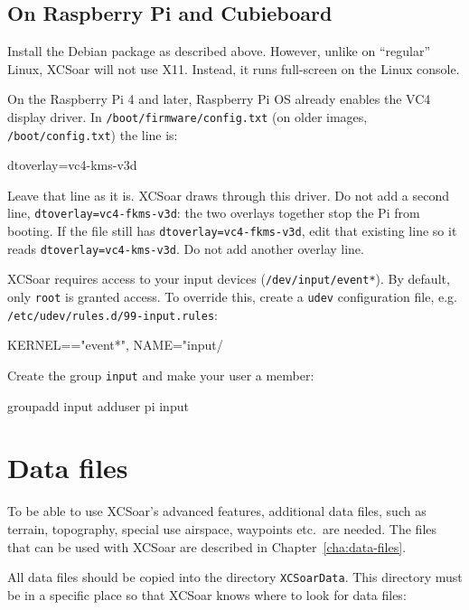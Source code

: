 \subsection*{On Raspberry Pi and Cubieboard}

Install the Debian package as described above.  However, unlike on
``regular'' Linux, XCSoar will not use X11.  Instead, it runs
full-screen on the Linux console.

On the Raspberry Pi 4 and later, Raspberry Pi OS already enables the
VC4 display driver.  In \texttt{/boot/firmware/config.txt} (on older
images, \texttt{/boot/config.txt}) the line is:

\begin{verbatim*}
dtoverlay=vc4-kms-v3d
\end{verbatim*}

Leave that line as it is.  XCSoar draws through this driver.  Do not
add a second line, \texttt{dtoverlay=vc4-fkms-v3d}: the two overlays
together stop the Pi from booting.  If the file still has
\texttt{dtoverlay=vc4-fkms-v3d}, edit that existing line so it reads
\texttt{dtoverlay=vc4-kms-v3d}.  Do not add another overlay line.

XCSoar requires access to your input devices
(\texttt{/dev/input/event*}).  By default, only \texttt{root} is
granted access.  To override this, create a \texttt{udev}
configuration file, e.g. \texttt{/etc/udev/rules.d/99-input.rules}:

\begin{verbatim*}
KERNEL=="event*", NAME="input/%
\end{verbatim*}

Create the group \texttt{input} and make your user a member:

\begin{verbatim*}
groupadd input
adduser pi input
\end{verbatim*}

\section{Data files}\label{sec:data files}

To be able to use XCSoar's advanced features, additional data files, such as
terrain, topography, special use airspace, waypoints etc.\ are needed. The files
that can be used with XCSoar are described in Chapter~\ref{cha:data-files}.

All data files should be copied into the directory
\texttt{XCSoarData}.  This directory must be in a specific place
so that XCSoar knows where to look for data files:

